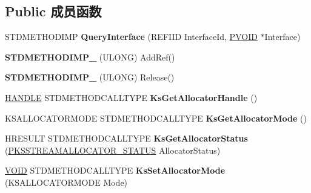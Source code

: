 \subsection*{Public 成员函数}
\begin{DoxyCompactItemize}
\item 
\mbox{\label{class_c_ks_allocator_a79db289212fbce8cc0287ea861000302}} 
S\+T\+D\+M\+E\+T\+H\+O\+D\+I\+MP {\bfseries Query\+Interface} (R\+E\+F\+I\+ID Interface\+Id, \hyperlink{interfacevoid}{P\+V\+O\+ID} $\ast$Interface)
\item 
\mbox{\label{class_c_ks_allocator_ac4dea3cc34d7040ba4dd91669d1b5b0c}} 
{\bfseries S\+T\+D\+M\+E\+T\+H\+O\+D\+I\+M\+P\+\_\+} (U\+L\+O\+NG) Add\+Ref()
\item 
\mbox{\label{class_c_ks_allocator_a4373549a82d31109c8b5a91c7e326a4d}} 
{\bfseries S\+T\+D\+M\+E\+T\+H\+O\+D\+I\+M\+P\+\_\+} (U\+L\+O\+NG) Release()
\item 
\mbox{\label{class_c_ks_allocator_ad7673ec6555f6ff47bd28f0b3bbf583a}} 
\hyperlink{interfacevoid}{H\+A\+N\+D\+LE} S\+T\+D\+M\+E\+T\+H\+O\+D\+C\+A\+L\+L\+T\+Y\+PE {\bfseries Ks\+Get\+Allocator\+Handle} ()
\item 
\mbox{\label{class_c_ks_allocator_a0fedb05b450acd0ba2f380a32ef36685}} 
K\+S\+A\+L\+L\+O\+C\+A\+T\+O\+R\+M\+O\+DE S\+T\+D\+M\+E\+T\+H\+O\+D\+C\+A\+L\+L\+T\+Y\+PE {\bfseries Ks\+Get\+Allocator\+Mode} ()
\item 
\mbox{\label{class_c_ks_allocator_aa8be65e4e277dd171d3d366617e200a2}} 
H\+R\+E\+S\+U\+LT S\+T\+D\+M\+E\+T\+H\+O\+D\+C\+A\+L\+L\+T\+Y\+PE {\bfseries Ks\+Get\+Allocator\+Status} (\hyperlink{struct_k_s_s_t_r_e_a_m_a_l_l_o_c_a_t_o_r___s_t_a_t_u_s}{P\+K\+S\+S\+T\+R\+E\+A\+M\+A\+L\+L\+O\+C\+A\+T\+O\+R\+\_\+\+S\+T\+A\+T\+US} Allocator\+Status)
\item 
\mbox{\label{class_c_ks_allocator_a1e65c737f2098bcba7e68b5d63f14943}} 
\hyperlink{interfacevoid}{V\+O\+ID} S\+T\+D\+M\+E\+T\+H\+O\+D\+C\+A\+L\+L\+T\+Y\+PE {\bfseries Ks\+Set\+Allocator\+Mode} (K\+S\+A\+L\+L\+O\+C\+A\+T\+O\+R\+M\+O\+DE Mode)
\item 

\end{DoxyCompactItemize}
